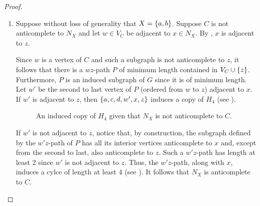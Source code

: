 \begin{proof}
\begin{enumerate}[label= (\roman*)]
        
        \item Suppose without loss of generality that $X=\left\{a,b\right\}$. Suppose $C$
            is not anticomplete to $N_X$ and let $w\in V_C$ be adjacent to $x\in
            N_X$. By , $x$ is adjacent to $z$.

            Since $w$ is a vertex of $C$ and such a subgraph is not anticomplete
            to $z$, it follows that there is a $wz$-path $P$ of minimum length
            contained in $V_C\cup \left\{z\right\}$. Furthermore, $P$ is an induced
            subgraph of $G$ since it is of minimum length. Let $w'$ be the
            second to last vertex of $P$ (ordered from $w$ to $z$) adjacent to
            $x$. If $w'$ is adjacent to $z$, then $\left\{a,c,d,w',x,z\right\}$ induces a
            copy of $H_4$ (see ).

            \begin{figure}[htb!]
                \centering
                \caption{An induced copy of $H_4$ given that $N_X$ is not
                    anticomplete to $C$.}
                \label{fig:chordal_anti_2_bag}
            \end{figure}

            If $w'$ is not adjacent to $z$, notice that, by construction, the
            subgraph defined by the $w'z$-path of $P$ has all its interior
            vertices anticomplete to $x$ and, except from the second to last,
            also anticomplete to $z$.  Such a $w'z$-path has length at least 2
            since $w'$ is not adjacent to $z$. Thus, the $w'z$-path, along with
            $x$, induces a cylce of length at least 4 (see
            ). It follows that $N_X$ is
            anticomplete to $C$.


\end{enumerate}
\end{proof}
